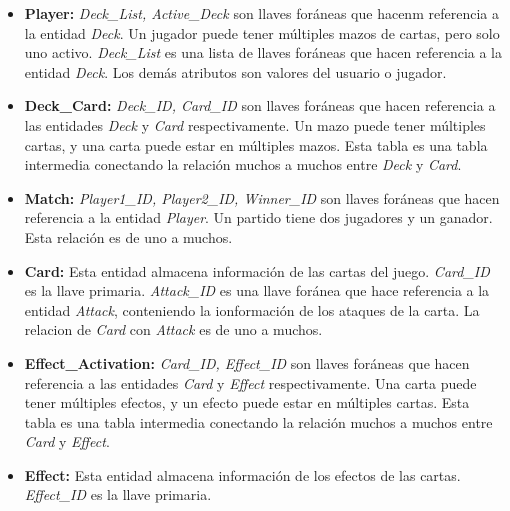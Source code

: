\documentclass{article}
\begin{document}
\begin{itemize}
  \item \textbf{Player:} \textit{Deck\_List, Active\_Deck} son llaves foráneas que hacenm referencia a la entidad \textit{Deck}. Un jugador puede tener múltiples mazos de cartas, pero solo uno activo. \textit{Deck\_List} es una lista de llaves foráneas que hacen referencia a la entidad \textit{Deck}. Los demás atributos son valores del usuario o jugador. 
  \item \textbf{Deck\_Card:} \textit{Deck\_ID, Card\_ID} son llaves foráneas que hacen referencia a las entidades \textit{Deck} y \textit{Card} respectivamente. Un mazo puede tener múltiples cartas, y una carta puede estar en múltiples mazos. Esta tabla es una tabla intermedia conectando la relación muchos a muchos entre \textit{Deck} y \textit{Card}. 
  \item \textbf{Match:} \textit{Player1\_ID, Player2\_ID, Winner\_ID} son llaves foráneas que hacen referencia a la entidad \textit{Player}. Un partido tiene dos jugadores y un ganador. Esta relaci\'on es de uno a muchos. 
  \item \textbf{Card:} Esta entidad almacena informaci\'on de las cartas del juego. \textit{Card\_ID} es la llave primaria. \textit{Attack\_ID} es una llave foránea que hace referencia a la entidad \textit{Attack}, conteniendo la ionformaci\'on de los ataques de la carta. La relacion de \textit{Card} con \textit{Attack} es de uno a muchos. 
  \item \textbf{Effect\_Activation:} \textit{Card\_ID, Effect\_ID} son llaves foráneas que hacen referencia a las entidades \textit{Card} y \textit{Effect} respectivamente. Una carta puede tener múltiples efectos, y un efecto puede estar en múltiples cartas. Esta tabla es una tabla intermedia conectando la relación muchos a muchos entre \textit{Card} y \textit{Effect}. 
  \item \textbf{Effect:} Esta entidad almacena informaci\'on de los efectos de las cartas. \textit{Effect\_ID} es la llave primaria.

\end{itemize}
\end{document}
